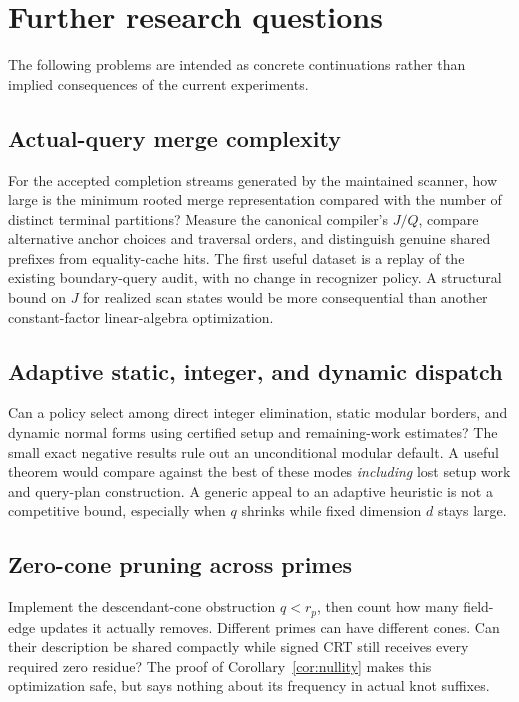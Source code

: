 \documentclass[11pt,letterpaper]{article}
\theoremstyle{definition}\newtheorem{definition}[theorem]{Definition}
\theoremstyle{remark}\newtheorem{remark}[theorem]{Remark}
\begin{document}
\section{Further research questions}
\label{sec:future}

The following problems are intended as concrete continuations rather than implied consequences of the current experiments.

\subsection{Actual-query merge complexity}
For the accepted completion streams generated by the maintained scanner, how large is the minimum rooted merge representation compared with the number of distinct terminal partitions? Measure the canonical compiler's $J/Q$, compare alternative anchor choices and traversal orders, and distinguish genuine shared prefixes from equality-cache hits. The first useful dataset is a replay of the existing boundary-query audit, with no change in recognizer policy. A structural bound on $J$ for realized scan states would be more consequential than another constant-factor linear-algebra optimization.

\subsection{Adaptive static, integer, and dynamic dispatch}
Can a policy select among direct integer elimination, static modular borders, and dynamic normal forms using certified setup and remaining-work estimates? The small exact negative results rule out an unconditional modular default. A useful theorem would compare against the best of these modes \emph{including} lost setup work and query-plan construction. A generic appeal to an adaptive heuristic is not a competitive bound, especially when $q$ shrinks while fixed dimension $d$ stays large.

\subsection{Zero-cone pruning across primes}
Implement the descendant-cone obstruction $q<r_p$, then count how many field-edge updates it actually removes. Different primes can have different cones. Can their description be shared compactly while signed CRT still receives every required zero residue? The proof of Corollary~\ref{cor:nullity} makes this optimization safe, but says nothing about its frequency in actual knot suffixes.
\end{document}
